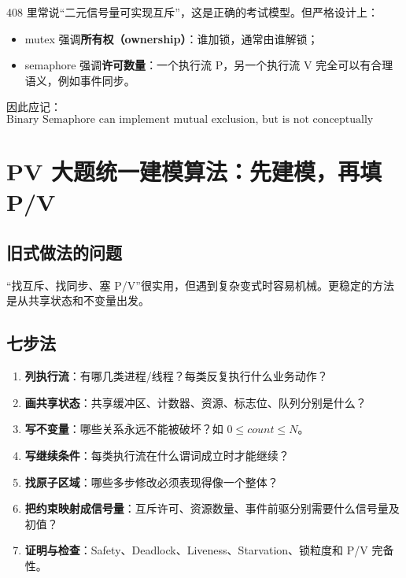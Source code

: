 \documentclass[11pt,a4paper]{ctexart}
\newcommand{\kw}[1]{\textbf{#1}}
\begin{document}
408 里常说“二元信号量可实现互斥”，这是正确的考试模型。但严格设计上：
\begin{itemize}
\item mutex 强调\kw{所有权（ownership）}：谁加锁，通常由谁解锁；
\item semaphore 强调\kw{许可数量}：一个执行流 P，另一个执行流 V 完全可以有合理语义，例如事件同步。
\end{itemize}
因此应记：
\[
\boxed{\text{Binary Semaphore can implement mutual exclusion, but is not conceptually identical to a mutex.}}
\]

\section{PV 大题统一建模算法：先建模，再填 P/V}

\subsection{旧式做法的问题}

“找互斥、找同步、塞 P/V”很实用，但遇到复杂变式时容易机械。更稳定的方法是从共享状态和不变量出发。

\subsection{七步法}

\begin{method}[PV 通用七步法]
\begin{enumerate}
\item \kw{列执行流}：有哪几类进程/线程？每类反复执行什么业务动作？
\item \kw{画共享状态}：共享缓冲区、计数器、资源、标志位、队列分别是什么？
\item \kw{写不变量}：哪些关系永远不能被破坏？如 $0\le count\le N$。
\item \kw{写继续条件}：每类执行流在什么谓词成立时才能继续？
\item \kw{找原子区域}：哪些多步修改必须表现得像一个整体？
\item \kw{把约束映射成信号量}：互斥许可、资源数量、事件前驱分别需要什么信号量及初值？
\item \kw{证明与检查}：Safety、Deadlock、Liveness、Starvation、锁粒度和 P/V 完备性。
\end{enumerate}
\end{method}
\end{document}
